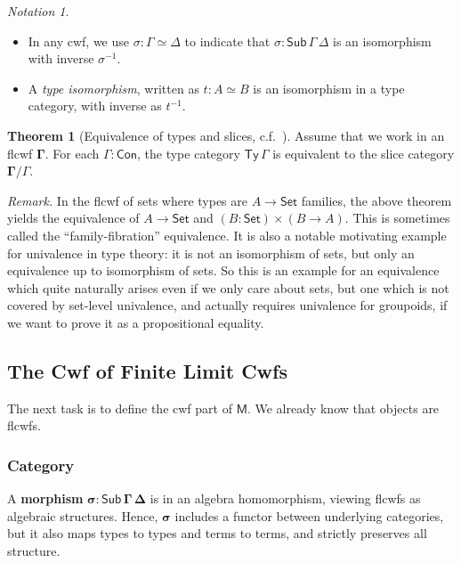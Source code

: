 \documentclass[12pt,a4paper,twoside,openany]{book}
\theoremstyle{remark}
\newtheorem{notation}{Notation}
\theoremstyle{definition}
\theoremstyle{theorem}
\newtheorem{theorem}{Theorem}
\newcommand{\bs}[1]{\boldsymbol{#1}}
\newcommand{\Con}{\mathsf{Con}}
\newcommand{\Sub}{\mathsf{Sub}}
\newcommand{\Ty}{\mathsf{Ty}}
\newcommand{\Set}{\mathsf{Set}}
\newcommand{\bSub}{\bs{\Sub}}
\newcommand{\bGamma}{\bs{\Gamma}}
\newcommand{\bDelta}{\bs{\Delta}}
\newcommand{\bsigma}{\bs{\sigma}}
\newcommand{\bM}{\bs{\mathsf{M}}}
\begin{document}
\begin{notation}
  ~\\
  \begin{itemize}
  \item  \vspace{-1.7em}
         In any cwf, we use $\sigma : \Gamma \simeq \Delta$ to indicate
         that $\sigma : \Sub\,\Gamma\,\Delta$ is an isomorphism with inverse $\sigma^{-1}$.
    \item A \emph{type isomorphism}, written as $t : A \simeq B$ is an isomorphism in a
         type category, with inverse as $t^{-1}$.
  \end{itemize}
\end{notation}

\begin{theorem}[Equivalence of types and slices, c.f.\ {\cite[Section 2.2]{clairambault2014biequivalence}}]\label{thm:ty-slice}
Assume that we work in an flcwf $\bGamma$. For each $\Gamma : \Con$, the type
category $\Ty\,\Gamma$ is equivalent to the slice category $\bGamma/\Gamma$.
\end{theorem}

\emph{Remark.} In the flcwf of sets where types are $A \to \Set$ families, the
above theorem yields the equivalence of $A \to \Set$ and $(B : \Set) \times (B
\to A)$. This is sometimes called the ``family-fibration'' equivalence. It is
also a notable motivating example for univalence in type theory: it is not an
isomorphism of sets, but only an equivalence up to isomorphism of sets. So this
is an example for an equivalence which quite naturally arises even if we only
care about sets, but one which is not covered by set-level univalence, and
actually requires univalence for groupoids, if we want to prove it as a
propositional equality.

\subsection{The Cwf of Finite Limit Cwfs}

The next task is to define the cwf part of $\bM$. We already know that objects
are flcwfs.

\subsubsection{Category}

A \textbf{morphism} $\bsigma : \bSub\,\bGamma\,\bDelta$ is in an algebra
homomorphism, viewing flcwfs as algebraic structures. Hence, $\bsigma$ includes
a functor between underlying categories, but it also maps types to types and
terms to terms, and strictly preserves all structure.
\end{document}
